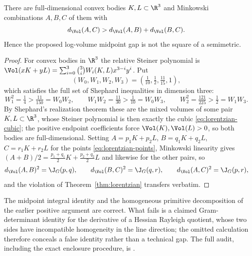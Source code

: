 \begin{theorem}\label{thm:volume-distance}
There are full-dimensional convex bodies $K,L\subset\R^3$ and Minkowski combinations $A,B,C$ of them with
\[
d_{\Vol}(A,C)>d_{\Vol}(A,B)+d_{\Vol}(B,C).
\]
Hence the proposed log-volume midpoint gap is not the square of a semimetric.
\end{theorem}
\begin{proof}
For convex bodies in $\R^3$ the relative Steiner polynomial is $\Vol(xK+yL)=\sum_{i=0}^3\binom3iW_i(K,L)x^{3-i}y^i$.  Put
\[
(W_0,W_1,W_2,W_3)=\left(\tfrac1{10},\tfrac12,\tfrac{11}{15},1\right),
\]
which satisfies the full set of Shephard inequalities in dimension three:
\[
W_1^2=\tfrac14>\tfrac{11}{150}=W_0W_2,\qquad
W_1W_2=\tfrac{11}{30}>\tfrac1{10}=W_0W_3,\qquad
W_2^2=\tfrac{121}{225}>\tfrac12=W_1W_3.
\]
By Shephard's realization theorem \citeyearpar[Theorem~4]{Shephard} these are the mixed volumes of some pair $K,L\subset\R^3$, whose Steiner polynomial is then exactly the cubic \eqref{eq:lorentzian-cubic}; the positive endpoint coefficients force $\Vol(K),\Vol(L)>0$, so both bodies are full-dimensional.  Setting $A=p_1K+p_2L$, $B=q_1K+q_2L$, $C=r_1K+r_2L$ for the points \eqref{eq:lorentzian-points}, Minkowski linearity gives $(A+B)/2=\frac{p_1+q_1}2K+\frac{p_2+q_2}2L$ and likewise for the other pairs, so
\[
d_{\Vol}(A,B)^2=\J_G(p,q),\qquad
d_{\Vol}(B,C)^2=\J_G(q,r),\qquad
d_{\Vol}(A,C)^2=\J_G(p,r),
\]
and the violation of Theorem~\ref{thm:lorentzian} transfers verbatim.
\end{proof}

\begin{remark}
The midpoint integral identity and the homogeneous primitive decomposition of the earlier positive argument are correct.  What fails is a claimed Gram-determinant identity for the derivative of a Hessian Rayleigh quotient, whose two sides have incompatible homogeneity in the line direction; the omitted calculation therefore conceals a false identity rather than a technical gap.  The full audit, including the exact enclosure procedure, is .
\end{remark}
